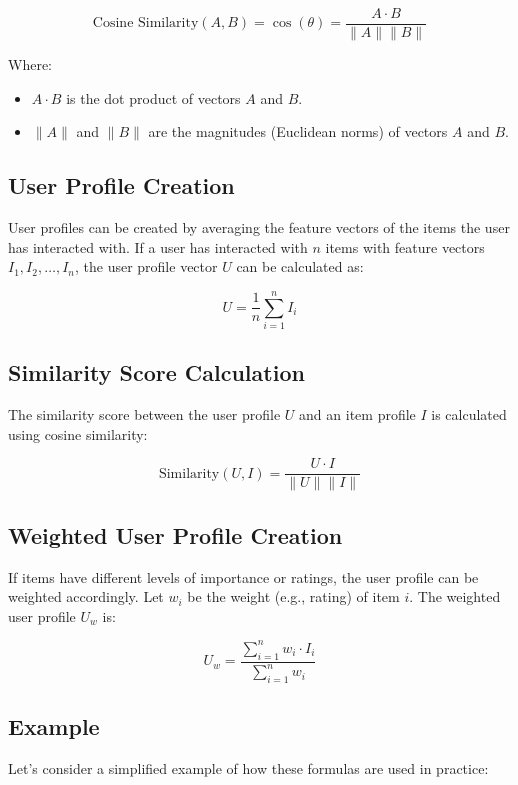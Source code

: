 \documentclass[12pt, a4paper, oneside]{article}
\begin{document}
\[
\text{Cosine Similarity}(A,B) = \cos(\theta) = \frac{A \cdot B}{\|A\| \|B\|}
\]

Where:

\begin{itemize}
    \item \( A \cdot B \) is the dot product of vectors \( A \) and \( B \).
    \item \( \|A\| \) and \( \|B\| \) are the magnitudes (Euclidean norms) of vectors \( A \) and \( B \).
\end{itemize}

\subsection*{User Profile Creation}

User profiles can be created by averaging the feature vectors of the items the user has interacted with. If a user has interacted with \( n \) items with feature vectors \( I_1, I_2, \ldots, I_n \), the user profile vector \( U \) can be calculated as:

\[
U = \frac{1}{n} \sum_{i=1}^{n} I_i
\]

\subsection*{Similarity Score Calculation}

The similarity score between the user profile \( U \) and an item profile \( I \) is calculated using cosine similarity:

\[
\text{Similarity}(U, I) = \frac{U \cdot I}{\|U\| \|I\|}
\]

\subsection*{Weighted User Profile Creation}

If items have different levels of importance or ratings, the user profile can be weighted accordingly. Let \( w_i \) be the weight (e.g., rating) of item \( i \). The weighted user profile \( U_w \) is:

\[
U_w = \frac{\sum_{i=1}^{n} w_i \cdot I_i}{\sum_{i=1}^{n} w_i}
\]

\subsection*{Example}

Let's consider a simplified example of how these formulas are used in practice:
\end{document}
